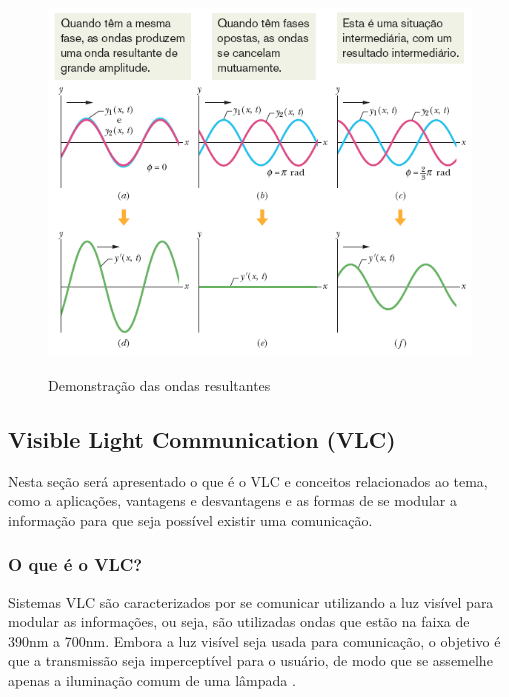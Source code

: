 \begin{figure}[!htbp]
  \caption{Demonstração das ondas resultantes}
  \includegraphics[scale=0.42]{images/ondas_interferencia.png}
  \label{fig:ondas_inter}
\end{figure}

\newpage


\subsection{Visible Light Communication (VLC)}

Nesta seção será apresentado o que é o VLC e conceitos relacionados ao tema, como a aplicações, vantagens e desvantagens e as formas de se modular a informação para que seja possível existir uma comunicação.

\subsubsection{O que é o VLC?}

Sistemas VLC são caracterizados por se comunicar utilizando a luz visível para modular as informações, ou seja, são utilizadas ondas que estão na faixa de 390nm a 700nm. Embora a luz visível seja usada para comunicação, o objetivo é que a transmissão seja imperceptível para o usuário, de modo que se assemelhe apenas a iluminação comum de uma lâmpada \cite{matheus2017comunicaccao}.

